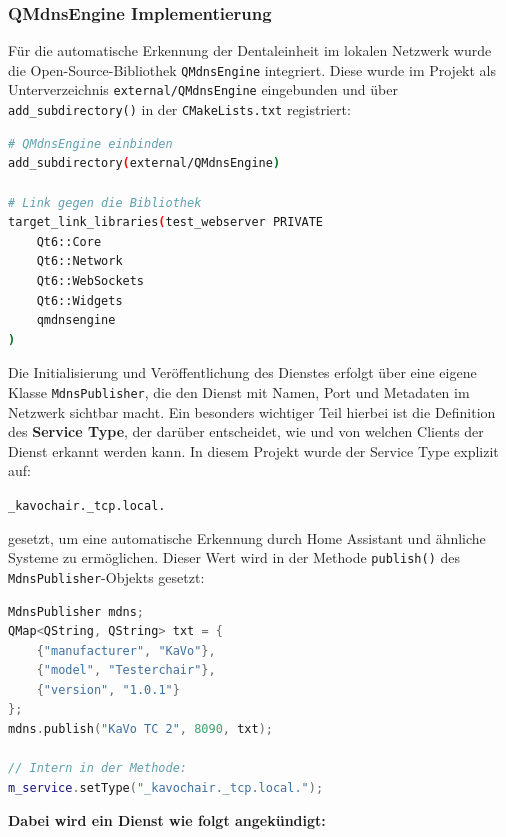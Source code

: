 \vspace{1em}
\subsubsection{QMdnsEngine Implementierung}

Für die automatische Erkennung der Dentaleinheit im lokalen Netzwerk wurde die Open-Source-Bibliothek \texttt{QMdnsEngine} integriert. Diese wurde im Projekt als Unterverzeichnis \texttt{external/QMdnsEngine} eingebunden und über \texttt{add\_subdirectory()} in der \texttt{CMakeLists.txt} registriert:
\vspace{1cm}
\begin{lstlisting}[language=bash,caption={Einbindung der QMdnsEngine in das Projekt},label={lst:cmake-qmdns}]
# QMdnsEngine einbinden
add_subdirectory(external/QMdnsEngine)

# Link gegen die Bibliothek
target_link_libraries(test_webserver PRIVATE
    Qt6::Core
    Qt6::Network
    Qt6::WebSockets
    Qt6::Widgets
    qmdnsengine
)
\end{lstlisting}
\vspace{1cm}
Die Initialisierung und Veröffentlichung des Dienstes erfolgt über eine eigene Klasse \texttt{MdnsPublisher}, die den Dienst mit Namen, Port und Metadaten im Netzwerk sichtbar macht. Ein besonders wichtiger Teil hierbei ist die Definition des \textbf{Service Type}, der darüber entscheidet, wie und von welchen Clients der Dienst erkannt werden kann. In diesem Projekt wurde der Service Type explizit auf:

\begin{center}
\texttt{\_kavochair.\_tcp.local.}
\end{center}

gesetzt, um eine automatische Erkennung durch Home Assistant und ähnliche Systeme zu ermöglichen. Dieser Wert wird in der Methode \texttt{publish()} des \texttt{MdnsPublisher}-Objekts gesetzt:
\vspace{1cm}
\begin{lstlisting}[language=c++,caption={mDNS-Dienst mit QMdnsEngine veröffentlichen},label={lst:qmdns-publish}]
MdnsPublisher mdns;
QMap<QString, QString> txt = {
    {"manufacturer", "KaVo"},
    {"model", "Testerchair"},
    {"version", "1.0.1"}
};
mdns.publish("KaVo TC 2", 8090, txt);

// Intern in der Methode:
m_service.setType("_kavochair._tcp.local.");
\end{lstlisting}
\vspace{1cm}
\textbf{Dabei wird ein Dienst wie folgt angekündigt:}

